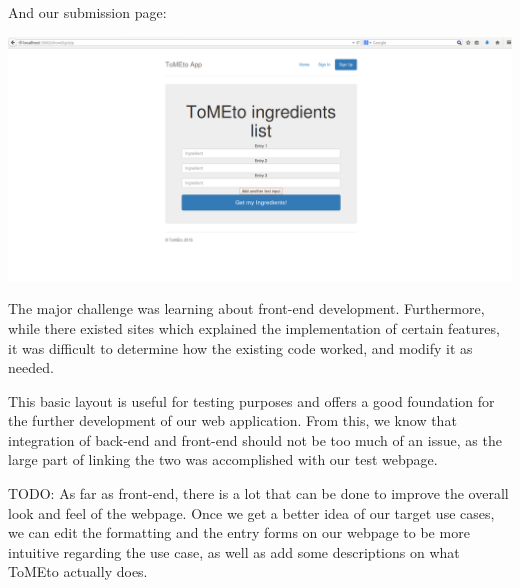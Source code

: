 \documentclass{article}
\begin{document}
And our submission page: \\
\begin{center}
\includegraphics[scale=0.3]{secondpage.PNG}
\end{center}
 

The major challenge was learning about front-end development. Furthermore, while there existed sites which explained the implementation of certain features, it was difficult to determine how the existing code worked, and modify it as needed. 

This basic layout is useful for testing purposes and offers a good foundation for the further development of our web application. From this, we know that integration of back-end and front-end should not be too much of an issue, as the large part of linking the two was accomplished with our test webpage.

TODO: As far as front-end, there is a lot that can be done to improve the overall look and feel of the webpage. Once we get a better idea of our target use cases, we can edit the formatting and the entry forms on our webpage to be more intuitive regarding the use case, as well as add some descriptions on what ToMEto actually does. 
\end{document}
